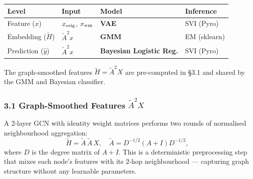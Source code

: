\documentclass[11pt]{article}
\begin{document}
\begin{longtable}[]{@{}
  >{\raggedright\arraybackslash}p{}
  >{\raggedright\arraybackslash}p{}
  >{\raggedright\arraybackslash}p{}
  >{\raggedright\arraybackslash}p{}@{}}
\toprule\noalign{}
\begin{minipage}[b]{\linewidth}\raggedright
Level
\end{minipage} & \begin{minipage}[b]{\linewidth}\raggedright
Input
\end{minipage} & \begin{minipage}[b]{\linewidth}\raggedright
Model
\end{minipage} & \begin{minipage}[b]{\linewidth}\raggedright
Inference
\end{minipage} \\
\midrule\noalign{}
\endhead
\bottomrule\noalign{}
\endlastfoot
Feature (\(x\)) & \(x_{\rm orig}\), \(x_{\rm wm}\) & \textbf{VAE} & SVI
(Pyro) \\
Embedding (\(\tilde{H}\)) & \(\tilde{A}^2 x\) & \textbf{GMM} & EM
(sklearn) \\
Prediction (\(\hat{y}\)) & \(\tilde{A}^2 x\) & \textbf{Bayesian Logistic
Reg.} & SVI (Pyro) \\
\end{longtable}

The graph-smoothed features \(\tilde{H} = \tilde{A}^2 X\) are
pre-computed in §3.1 and shared by the GMM and Bayesian classifier.

    \subsubsection{\texorpdfstring{3.1 Graph-Smoothed Features
\(\tilde{A}^2 X\)}{3.1 Graph-Smoothed Features \textbackslash tilde\{A\}\^{}2 X}}\label{graph-smoothed-features-tildea2-x}

A 2-layer GCN with identity weight matrices performs two rounds of
normalised neighbourhood aggregation: \[
\tilde{H} = \tilde{A}\,\tilde{A}\,X, \quad
\tilde{A} = D^{-1/2}(A+I)D^{-1/2},
\] where \(D\) is the degree matrix of \(A+I\). This is a deterministic
preprocessing step that mixes each node's features with its 2-hop
neighbourhood --- capturing graph structure without any learnable
parameters.
\end{document}
